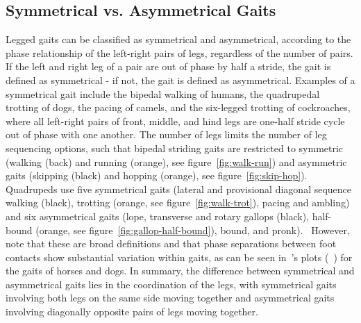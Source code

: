     \subsection{Symmetrical vs. Asymmetrical Gaits}

    Legged gaits can be classified as symmetrical and asymmetrical, according to the phase relationship of the left-right pairs of legs, regardless of the number of pairs. If the left and right leg of a pair are out of phase by half a stride, the gait is defined as symmetrical - if not, the gait is defined as asymmetrical. Examples of a symmetrical gait include the bipedal walking of humans, the quadrupedal trotting of dogs, the pacing of camels, and the six-legged trotting of cockroaches, where all left-right pairs of front, middle, and hind legs are one-half stride cycle out of phase with one another. The number of legs limits the number of leg sequencing options, such that bipedal striding gaits are restricted to symmetric (walking (back) and running (orange), see figure~\ref{fig:walk-run}) and asymmetric gaits (skipping (black) and hopping (orange), see figure~\ref{fig:skip-hop}). Quadrupeds use five symmetrical gaits (lateral and provisional diagonal sequence walking (black), trotting (orange, see figure~\ref{fig:walk-trot}), pacing and ambling) and six asymmetrical gaits (lope, transverse and rotary gallops (black), half-bound (orange, see figure~\ref{fig:gallop-half-bound}), bound, and pronk).~\cite{Lee2018} However, note that these are broad definitions and that phase separations between foot contacts show substantial variation within gaits, as can be seen in~\citeauthor{Hildebrand1965}'s plots (\cite{Hildebrand1965}~\cite{Hildebrand1968}) for the gaits of horses and dogs. In summary, the difference between symmetrical and asymmetrical gaits lies in the coordination of the legs, with symmetrical gaits involving both legs on the same side moving together and asymmetrical gaits involving diagonally opposite
    pairs of legs moving together.

